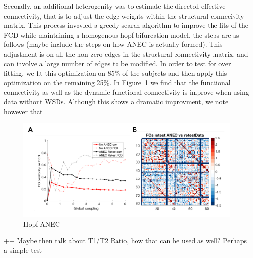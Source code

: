 \documentclass[oneside]{zHenriquesLab-StyleBioRxiv}
\begin{document}
Secondly, an additional heterogenity was to estimate the directed effective connectivity, that is to adjust the edge weights within the structural connecivity matrix. This process invovled a greedy search algorithm to improve the fits of the FCD while maintaining a homogenous hopf bifurcation model, the steps are as follows (maybe include the steps on how ANEC is actually formed). This adjustment is on all the non-zero edges in the structural connectivity matrix, and can involve a large number of edges to be modified. In order to test for over fitting, we fit this optimization on 85\% of the subjects and then apply this optimization on the remaining 25\%. In Figure~\ref{fig:FC_ANEC} we find that the functional connectivity as well as the dynamic functional connectivity is improve when using data without WSDs. Although this shows a dramatic improvment, we note however that 

\begin{figure}[ht!]
\includegraphics[width=1\textwidth]{figs/BTF_ANEC.png}
\caption{Hopf ANEC}\label{fig:FC_ANEC}
\end{figure}

++ Maybe then talk about T1/T2 Ratio, how that can be used as well? Perhaps a simple test












\end{document}
